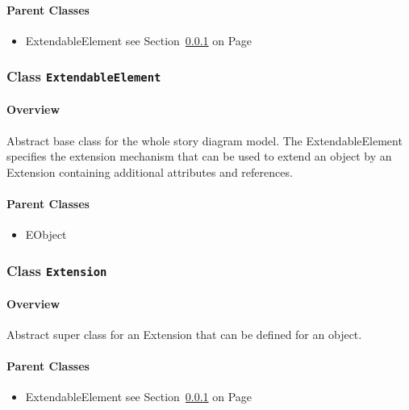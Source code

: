 \paragraph{Parent Classes}
\begin{itemize}
\item ExtendableElement see Section~\ref{cls:modeling::ExtendableElement} on Page~\pageref{cls:modeling::ExtendableElement}\end{itemize}
\subsubsection{\Large{Class \bfseries \texttt{ExtendableElement}\normalfont}}
\label{cls:modeling::ExtendableElement} 
\paragraph{Overview}

	
			
Abstract base class for the whole story diagram model. The ExtendableElement specifies the extension mechanism that can be used to extend an object by an Extension containing additional attributes and references.	
		
	



\paragraph{Parent Classes}
\begin{itemize}
\item EObject \end{itemize}
\subsubsection{\Large{Class \bfseries \texttt{Extension}\normalfont}}
\label{cls:modeling::Extension} 
\paragraph{Overview}

	
			
Abstract super class for an Extension that can be defined for an object.	
		
	



\paragraph{Parent Classes}
\begin{itemize}
\item ExtendableElement see Section~\ref{cls:modeling::ExtendableElement} on Page~\pageref{cls:modeling::ExtendableElement}\end{itemize}

